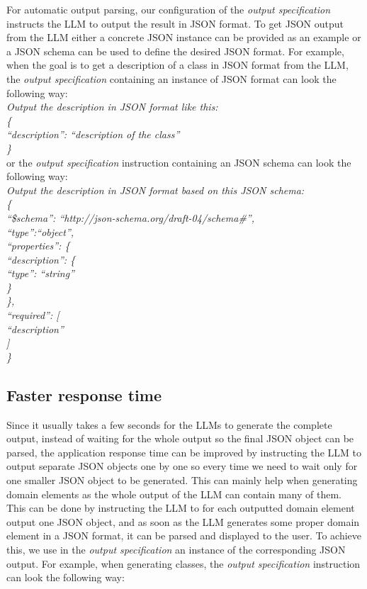 For automatic output parsing, our configuration of the \emph{output specification} instructs the LLM to output the result in JSON format. To get JSON output from the LLM either a concrete JSON instance can be provided as an example or a JSON schema can be used to define the desired JSON format. For example, when the goal is to get a description of a class in JSON format from the LLM, the \emph{output specification} containing an instance of JSON format can look the following way: \\

\noindent{}\textit{Output the description in JSON format like this: \\
\{ \\
\null \quad ``description'': ``description of the class'' \\
\}} \\

\noindent{}or the \emph{output specification} instruction containing an JSON schema can look the following way: \\

\noindent{}\textit{Output the description in JSON format based on this JSON schema: \\
\{ \\
\null \quad ``\$schema'': ``http://json-schema.org/draft-04/schema\#'', \\
\null \quad  ``type'':``object'', \\
\null \quad  ``properties'': \{ \\
\null \quad \quad ``description'': \{ \\
\null \quad \quad \quad ``type'': ``string'' \\
\null \quad \quad   \} \\
\null \quad  \}, \\
\null \quad  ``required'': [ \\
\null \quad \quad   ``description'' \\
\null \quad  ] \\
\}} \\


\subsection{Faster response time}

Since it usually takes a few seconds for the LLMs to generate the complete output, instead of waiting for the whole output so the final JSON object can be parsed, the application response time can be improved by instructing the LLM to output separate JSON objects one by one so every time we need to wait only for one smaller JSON object to be generated. This can mainly help when generating domain elements as the whole output of the LLM can contain many of them. This can be done by instructing the LLM to for each outputted domain element output one JSON object, and as soon as the LLM generates some proper domain element in a JSON format, it can be parsed and displayed to the user. To achieve this, we use in the \emph{output specification} an instance of the corresponding JSON output. For example, when generating classes, the \emph{output specification} instruction can look the following way: \\

